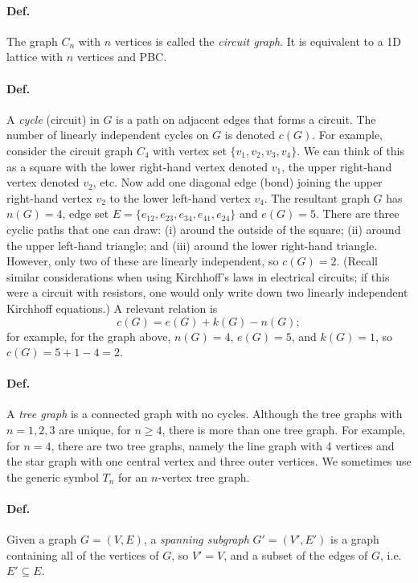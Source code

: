 \paragraph{Def.} The graph $C_n$ with $n$ vertices is called the \emph{circuit graph}. It is equivalent to a 1D lattice with
$n$ vertices and PBC.

\paragraph{Def.} A \emph{cycle} (circuit) in $G$ is a path on adjacent edges that forms a circuit. The number of linearly
independent cycles on $G$ is denoted $c(G)$. For example, consider the circuit graph $C_4$ with vertex set
$\{v_1,v_2,v_3,v_4\}$. We can think of this as a square with the lower right-hand vertex denoted $v_1$, the upper right-hand
vertex denoted $v_2$, etc. Now add one diagonal edge (bond) joining the upper right-hand vertex $v_2$ to the lower left-hand
vertex $v_4$. The resultant graph $G$ has $n(G) = 4$, edge set $E = \{e_{12},e_{23},e_{34},e_{41},e_{24}\}$ and
$e(G) = 5$. There are three cyclic paths that one can draw: (i) around the outside of the square; (ii) around the upper
left-hand triangle; and (iii) around the lower right-hand triangle. However, only two of these are linearly independent, so
$c(G) = 2$. (Recall similar considerations when using Kirchhoff's laws in electrical circuits; if this were a circuit with
resistors, one would only write down two linearly independent Kirchhoff equations.) A relevant relation is
\begin{equation}
  c(G) = e(G) + k(G) - n(G);
\end{equation}
for example, for the graph above, $n(G) = 4$, $e(G) = 5$, and $k(G) = 1$, so $c(G) = 5+1-4 = 2$.

\paragraph{Def.} A \emph{tree graph} is a connected graph with no cycles. Although the tree graphs with $n = 1,2,3$ are unique,
for $n\ge 4$, there is more than one tree graph. For example, for $n = 4$, there are two tree graphs, namely the line graph
with 4 vertices and the star graph with one central vertex and three outer vertices. We sometimes use the generic symbol $T_n$
for an $n$-vertex tree graph.

\paragraph{Def.} Given a graph $G = (V,E)$, a \emph{spanning subgraph} $G' = (V',E')$ is a graph containing all of the vertices
of $G$, so $V' = V$, and a subset of the edges of $G$, i.e.\ $E'\subseteq E$.

